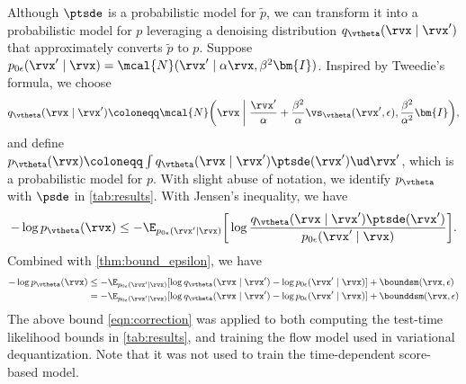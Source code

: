 Although $\ptsde$ is a probabilistic model for $\tilde{p}$, we can transform it into a probabilistic model for $p$ leveraging a denoising distribution $q_\vtheta(\rvx \mid \rvx')$ that approximately converts $\tilde{p}$ to $p$. Suppose $p_{0\epsilon}(\rvx'\mid \rvx) = \mcal{N}(\rvx' \mid \alpha \rvx, \beta^2 \bm{I})$. Inspired by Tweedie's formula, we choose 
\begin{align*}
    q_\vtheta(\rvx \mid \rvx') \coloneqq \mcal{N}\bigg(\rvx \mathrel\bigg| \frac{\rvx'}{\alpha} + \frac{\beta^2}{\alpha} \vs_\vtheta(\rvx', \epsilon), \frac{\beta^2}{\alpha^2}\bm{I}\bigg),
\end{align*}
and define $p_\vtheta(\rvx) \coloneqq \int q_\vtheta(\rvx \mid \rvx') \ptsde(\rvx') \ud \rvx'$, which is a probabilistic model for $p$. With slight abuse of notation, we identify $p_\vtheta$ with $\psde$ in \cref{tab:results}. With Jensen's inequality, we have
\begin{align*}
    -\log p_\vtheta(\rvx) \leq -\E_{p_{0\epsilon}(\rvx' \mid \rvx)}\bigg[ \log \frac{q_\vtheta(\rvx \mid \rvx') \ptsde(\rvx')}{p_{0\epsilon}(\rvx' \mid \rvx)} \bigg].
\end{align*}
Combined with \cref{thm:bound_epsilon}, we have
\begin{align}
    -\log p_\vtheta(\rvx) &\leq -\E_{p_{0\epsilon}(\rvx' \mid \rvx)}[\log q_\vtheta(\rvx \mid \rvx') - \log p_{0\epsilon}(\rvx' \mid \rvx)] + \boundsm(\rvx, \epsilon)\\
    &= -\E_{p_{0\epsilon}(\rvx' \mid \rvx)}[\log q_\vtheta(\rvx \mid \rvx') - \log p_{0\epsilon}(\rvx' \mid \rvx)] + \bounddsm(\rvx, \epsilon) \label{eqn:correction}
\end{align}
The above bound \cref{eqn:correction} was applied to both computing the test-time likelihood bounds in \cref{tab:results}, and training the flow model used in variational dequantization. Note that it was not used to train the time-dependent score-based model.

